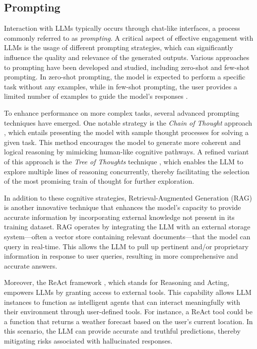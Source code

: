 \documentclass[
  a4paper,
  DIV=11,
  numbers=noendperiod]{scrreprt}
\theoremstyle{definition}
\theoremstyle{remark}
\begin{document}
\subsection{Prompting}\label{sec-prompting}

Interaction with LLMs typically occurs through chat-like interfaces, a
process commonly referred to as \emph{prompting}. A critical aspect of
effective engagement with LLMs is the usage of different prompting
strategies, which can significantly influence the quality and relevance
of the generated outputs. Various approaches to prompting have been
developed and studied, including zero-shot and few-shot prompting. In
zero-shot prompting, the model is expected to perform a specific task
without any examples, while in few-shot prompting, the user provides a
limited number of examples to guide the model's responses
\autocite{brown2020}.

To enhance performance on more complex tasks, several advanced prompting
techniques have emerged. One notable strategy is the \emph{Chain of
Thought} approach \autocite{chainofthought}, which entails presenting
the model with sample thought processes for solving a given task. This
method encourages the model to generate more coherent and logical
reasoning by mimicking human-like cognitive pathways. A refined variant
of this approach is the \emph{Tree of Thoughts} technique
\autocite{yao2023}, which enables the LLM to explore multiple lines of
reasoning concurrently, thereby facilitating the selection of the most
promising train of thought for further exploration.

In addition to these cognitive strategies, Retrieval-Augmented
Generation (RAG) \autocite{lewis2021} is another innovative technique
that enhances the model's capacity to provide accurate information by
incorporating external knowledge not present in its training dataset.
RAG operates by integrating the LLM with an external storage
system---often a vector store containing relevant documents---that the
model can query in real-time. This allows the LLM to pull up pertinent
and/or proprietary information in response to user queries, resulting in
more comprehensive and accurate answers.

Moreover, the ReAct framework \autocite{reAct}, which stands for
Reasoning and Acting, empowers LLMs by granting access to external
tools. This capability allows LLM instances to function as intelligent
agents that can interact meaningfully with their environment through
user-defined tools. For instance, a ReAct tool could be a function that
returns a weather forecast based on the user's current location. In this
scenario, the LLM can provide accurate and truthful predictions, thereby
mitigating risks associated with hallucinated responses.
\end{document}
